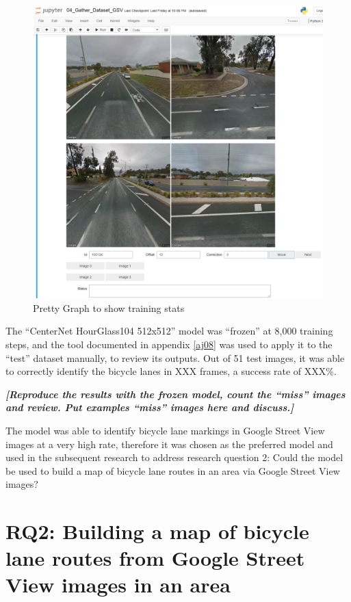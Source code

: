 \documentclass[11pt,twoside]{report}
\newcommand{\remark}[1]{{\bf \em [\marginpar{$\Leftarrow$}#1]}}
\begin{document}
\begin{figure}[h]
\centering
\includegraphics[scale=0.1]{a001_gui.png}
\caption{Pretty Graph to show training stats}
\label{fig:train_perf1}
\end{figure}


The ``CenterNet HourGlass104 512x512'' model was ``frozen'' at 8,000 training steps, and the tool documented in appendix \ref{aj08} was used to apply it to the ``test'' dataset manually, to review its outputs.  Out of 51 test images, it was able to correctly identify the bicycle lanes in XXX frames, a success rate of XXX\%.

\remark{Reproduce the results with the frozen model, count the ``miss'' images and review.  Put examples ``miss'' images here and discuss.}

The model was able to identify bicycle lane markings in Google Street View images at a very high rate, therefore it was chosen as the preferred model and used in the subsequent research to address research question 2:  Could the model be used to build a map of bicycle lane routes in an area via Google Street View images?



\section{RQ2: Building a map of bicycle lane routes from Google Street View images in an area}
\label{results:rq2}
\end{document}
